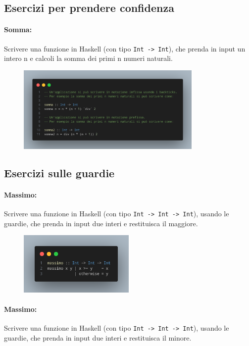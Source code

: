 \subsection{Esercizi per prendere confidenza}

\paragraph{Somma:} Scrivere una funzione in Haskell (con tipo \texttt{Int -> Int}), 
che prenda in input un intero n e calcoli la somma dei primi n numeri naturali.

\begin{figure}[!h]
    \centering
    \includegraphics[width=0.8\textwidth]{images/Somma.png}
\end{figure}

\subsection{Esercizi sulle guardie}

\paragraph{Massimo:} Scrivere una funzione in Haskell (con tipo \texttt{Int -> Int -> Int}), usando 
le guardie, che
prenda in input due interi e restituisca il maggiore.

\begin{figure}[!h]
    \centering
    \includegraphics[width=0.5\textwidth]{images/Massimo.png}
\end{figure}

\paragraph{Massimo:} Scrivere una funzione in Haskell (con tipo \texttt{Int -> Int -> Int}), usando 
le guardie, che
prenda in input due interi e restituisca il minore.

